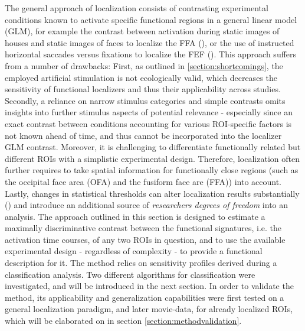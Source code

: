 \documentclass[a4paper, 12pt]{scrreprt}
\begin{document}
The general approach of localization consists of contrasting experimental conditions known to activate specific functional regions in a general linear model (GLM), for example the contrast between activation during static images of houses and static images of faces to localize the FFA (\cite{fox2009defining}), or the use of instructed horizontal saccades versus fixations to localize the FEF (\cite{connolly2002human}). This approach suffers from a number of drawbacks: \newline
First, as outlined in \ref{section:shortcomings}, the employed artificial stimulation is not ecologically valid, which decreases the sensitivity of functional localizers and thus their applicability across studies. Secondly, a reliance on narrow stimulus categories and simple contrasts omits insights into further stimulus aspects of potential relevance - especially since an exact contrast between conditions accounting for various ROI-specific factors is not known ahead of time, and thus cannot be incorporated into the localizer GLM contrast. Moreover, it is challenging to differentiate functionally related but different ROIs with a simplistic experimental design. Therefore, localization often further requires to take spatial information for functionally close regions (such as the occipital face area (OFA) and the fusiform face are (FFA)) into account.
Lastly, changes in statistical thresholds can alter localization results substantially (\cite{fox2009defining}) and introduce an additional source of \textit{researchers degrees of freedom} into an analysis.\newline
The approach outlined in this section is designed to estimate a maximally discriminative contrast between the functional signatures, i.e. the activation time courses, of any two ROIs in question, and to use the available experimental design - regardless of complexity - to provide a functional description for it.\newline
The method relies on sensitivity profiles derived during a classification analysis. Two different algorithms for classification were investigated, and will be introduced in the next section. In order to validate the method, its applicability and generalization capabilities were first tested on a general localization paradigm, and later movie-data, for already localized ROIs, which will be elaborated on in section \ref{section:methodvalidation}.
\end{document}
